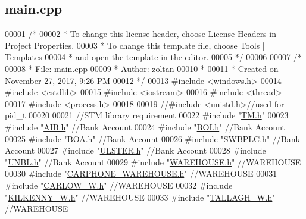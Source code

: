 \hypertarget{main_8cpp_source}{}\subsection{main.\+cpp}

\begin{DoxyCode}
00001 \textcolor{comment}{/*}
00002 \textcolor{comment}{ * To change this license header, choose License Headers in Project Properties.}
00003 \textcolor{comment}{ * To change this template file, choose Tools | Templates}
00004 \textcolor{comment}{ * and open the template in the editor.}
00005 \textcolor{comment}{ */}
00006 
00007 \textcolor{comment}{/*}
00008 \textcolor{comment}{ * File:   main.cpp}
00009 \textcolor{comment}{ * Author: zoltan}
00010 \textcolor{comment}{ *}
00011 \textcolor{comment}{ * Created on November 27, 2017, 9:26 PM}
00012 \textcolor{comment}{ */}
00013 \textcolor{preprocessor}{#include <windows.h>}
00014 \textcolor{preprocessor}{#include <cstdlib>}
00015 \textcolor{preprocessor}{#include <iostream>}
00016 \textcolor{preprocessor}{#include <thread>}
00017 \textcolor{preprocessor}{#include <process.h>}
00018 
00019 \textcolor{comment}{//#include <unistd.h>//used for pid\_t}
00020 
00021 \textcolor{comment}{//STM library requirement}
00022 \textcolor{preprocessor}{#include "\hyperlink{_t_m_8h}{TM.h}"}
00023 \textcolor{preprocessor}{#include "\hyperlink{_a_i_b_8h}{AIB.h}"}    \textcolor{comment}{//Bank Account}
00024 \textcolor{preprocessor}{#include "\hyperlink{_b_o_i_8h}{BOI.h}"}    \textcolor{comment}{//Bank Account}
00025 \textcolor{preprocessor}{#include "\hyperlink{_b_o_a_8h}{BOA.h}"}    \textcolor{comment}{//Bank Account}
00026 \textcolor{preprocessor}{#include "\hyperlink{_s_w_b_p_l_c_8h}{SWBPLC.h}"} \textcolor{comment}{//Bank Account}
00027 \textcolor{preprocessor}{#include "\hyperlink{_u_l_s_t_e_r_8h}{ULSTER.h}"} \textcolor{comment}{//Bank Account}
00028 \textcolor{preprocessor}{#include "\hyperlink{_u_n_b_l_8h}{UNBL.h}"}   \textcolor{comment}{//Bank Account}
00029 \textcolor{preprocessor}{#include "\hyperlink{_w_a_r_e_h_o_u_s_e_8h}{WAREHOUSE.h}"}   \textcolor{comment}{//WAREHOUSE}
00030 \textcolor{preprocessor}{#include "\hyperlink{_c_a_r_p_h_o_n_e___w_a_r_e_h_o_u_s_e_8h}{CARPHONE\_WAREHOUSE.h}"} \textcolor{comment}{//WAREHOUSE}
00031 \textcolor{preprocessor}{#include "\hyperlink{_c_a_r_l_o_w___w_8h}{CARLOW\_W.h}"}    \textcolor{comment}{//WAREHOUSE}
00032 \textcolor{preprocessor}{#include "\hyperlink{_k_i_l_k_e_n_n_y___w_8h}{KILKENNY\_W.h}"}  \textcolor{comment}{//WAREHOUSE}
00033 \textcolor{preprocessor}{#include "\hyperlink{_t_a_l_l_a_g_h___w_8h}{TALLAGH\_W.h}"}   \textcolor{comment}{//WAREHOUSE}

\end{DoxyCode}
